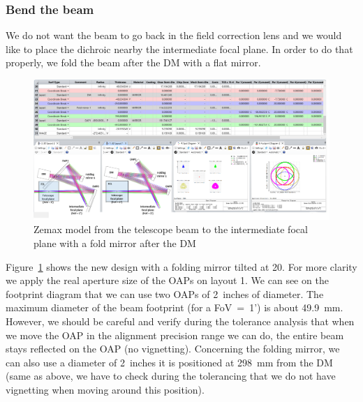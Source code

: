 \documentclass[12pt,a4paper]{article}
\begin{document}
\subsubsection{Bend the beam}
We do not want the beam to go back in the field correction lens and we would like to place the dichroic nearby the intermediate focal plane. In order to do that properly, we fold the beam after the DM with a flat mirror.
\begin{figure}[H]
	\begin{center}
		\includegraphics[width=\textwidth]{images/FP_2_intFP_FoldMirror.PNG}
		\caption{Zemax model from the telescope beam to the intermediate focal plane with a fold mirror after the DM}\label{fig:FP_2_intFP_FoldMirror}
	\end{center}
\end{figure}
Figure~\ref{fig:FP_2_intFP_FoldMirror} shows the new design with a folding mirror tilted at 20\degree. For more clarity we apply the real aperture size of the OAPs on layout 1. We can see on the footprint diagram that we can use two OAPs of 2~inches of diameter. The maximum diameter of the beam footprint (for a FoV~=~1') is about 49.9~mm. However, we should be careful and verify during the tolerance analysis that when we move the OAP in the alignment precision range we can do, the entire beam stays reflected on the OAP (no vignetting). Concerning the folding mirror, we can also use a diameter of 2~inches it is positioned at 298~mm from the DM (same as above, we have to check during the tolerancing that we do not have vignetting when moving around this position).\\
\end{document}

